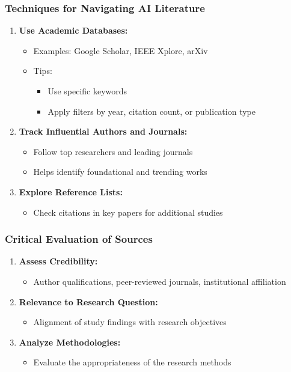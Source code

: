 \documentclass{beamer}
\begin{document}
\begin{frame}[fragile]
    \frametitle{Techniques for Navigating AI Literature}
    \begin{enumerate}
        \item \textbf{Use Academic Databases:}
            \begin{itemize}
                \item Examples: Google Scholar, IEEE Xplore, arXiv
                \item Tips:
                \begin{itemize}
                    \item Use specific keywords
                    \item Apply filters by year, citation count, or publication type
                \end{itemize}
            \end{itemize}

        \item \textbf{Track Influential Authors and Journals:}
            \begin{itemize}
                \item Follow top researchers and leading journals
                \item Helps identify foundational and trending works
            \end{itemize}

        \item \textbf{Explore Reference Lists:}
            \begin{itemize}
                \item Check citations in key papers for additional studies
            \end{itemize}
    \end{enumerate}
\end{frame}

\begin{frame}[fragile]
    \frametitle{Critical Evaluation of Sources}
    \begin{enumerate}
        \item \textbf{Assess Credibility:}
            \begin{itemize}
                \item Author qualifications, peer-reviewed journals, institutional affiliation
            \end{itemize}

        \item \textbf{Relevance to Research Question:}
            \begin{itemize}
                \item Alignment of study findings with research objectives
            \end{itemize}

        \item \textbf{Analyze Methodologies:}
            \begin{itemize}
                \item Evaluate the appropriateness of the research methods
            \end{itemize}
    \end{enumerate}
\end{frame}
\end{document}
